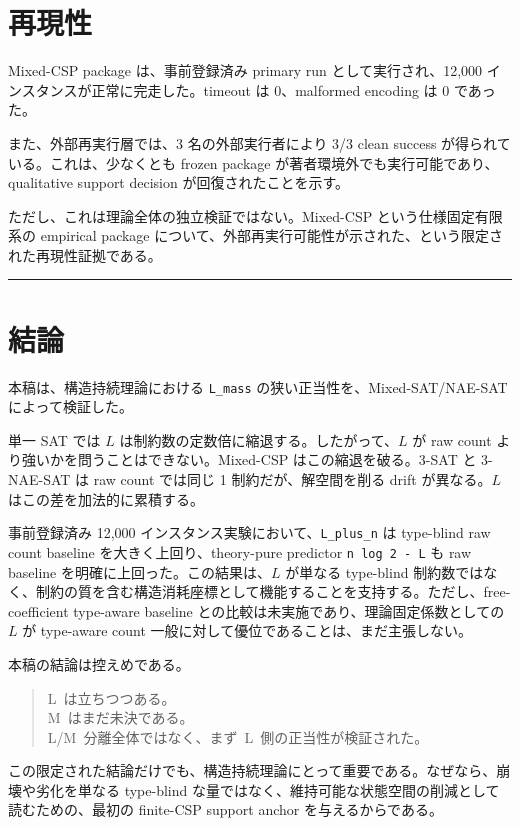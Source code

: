 \documentclass[12pt,a4paper]{article}
\begin{document}
\section{再現性}\label{ux518dux73feux6027}

Mixed-CSP package は、事前登録済み primary run として実行され、12,000 インスタンスが正常に完走した。timeout は 0、malformed encoding は 0 であった。

また、外部再実行層では、3 名の外部実行者により 3/3 clean success が得られている。これは、少なくとも frozen package が著者環境外でも実行可能であり、qualitative support decision が回復されたことを示す。

ただし、これは理論全体の独立検証ではない。Mixed-CSP という仕様固定有限系の empirical package について、外部再実行可能性が示された、という限定された再現性証拠である。

\begin{center}\rule{0.5\linewidth}{0.5pt}\end{center}

\section{結論}\label{ux7d50ux8ad6}

本稿は、構造持続理論における \texttt{L\_mass} の狭い正当性を、Mixed-SAT/NAE-SAT によって検証した。

単一 SAT では $L$ は制約数の定数倍に縮退する。したがって、$L$ が raw count より強いかを問うことはできない。Mixed-CSP はこの縮退を破る。3-SAT と 3-NAE-SAT は raw count では同じ 1 制約だが、解空間を削る drift が異なる。$L$ はこの差を加法的に累積する。

事前登録済み 12,000 インスタンス実験において、\texttt{L\_plus\_n} は type-blind raw count baseline を大きく上回り、theory-pure predictor \texttt{n\ log\ 2\ -\ L} も raw baseline を明確に上回った。この結果は、$L$ が単なる type-blind 制約数ではなく、制約の質を含む構造消耗座標として機能することを支持する。ただし、free-coefficient type-aware baseline との比較は未実施であり、理論固定係数としての $L$ が type-aware count 一般に対して優位であることは、まだ主張しない。

本稿の結論は控えめである。

\begin{quote}
{\small\ttfamily\noindent
L~は立ちつつある。 \\M~はまだ未決である。 \\L/M~分離全体ではなく、まず~L~側の正当性が検証された。
}
\end{quote}

この限定された結論だけでも、構造持続理論にとって重要である。なぜなら、崩壊や劣化を単なる type-blind な量ではなく、維持可能な状態空間の削減として読むための、最初の finite-CSP support anchor を与えるからである。
\end{document}
